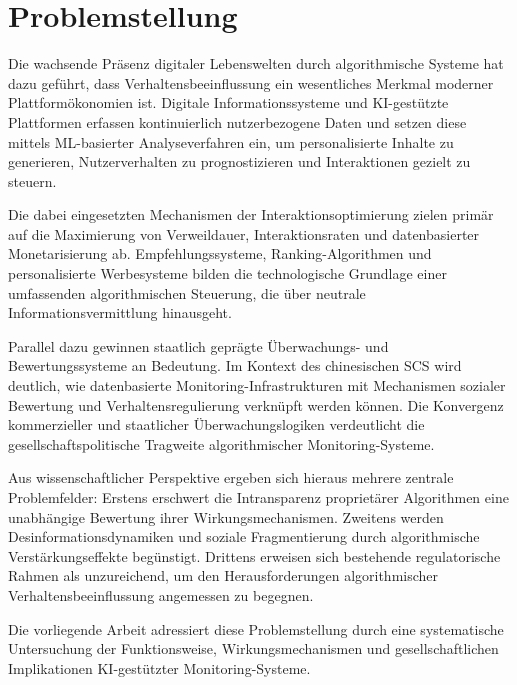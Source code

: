 \section{Problemstellung}

Die wachsende Präsenz digitaler Lebenswelten durch algorithmische Systeme hat dazu geführt, dass Verhaltensbeeinflussung ein wesentliches Merkmal moderner Plattformökonomien ist. Digitale Informationssysteme und \ac{KI}-gestützte Plattformen erfassen kontinuierlich nutzerbezogene Daten und setzen diese mittels \ac{ML}-basierter Analyseverfahren ein, um personalisierte Inhalte zu generieren, Nutzerverhalten zu prognostizieren und Interaktionen gezielt zu steuern.

Die dabei eingesetzten Mechanismen der Interaktionsoptimierung zielen primär auf die Maximierung von Verweildauer, Interaktionsraten und datenbasierter Monetarisierung ab. Empfehlungssysteme, Ranking-Algorithmen und personalisierte Werbesysteme bilden die technologische Grundlage einer umfassenden algorithmischen Steuerung, die über neutrale Informationsvermittlung hinausgeht.

Parallel dazu gewinnen staatlich geprägte Überwachungs- und Bewertungssysteme an Bedeutung. Im Kontext des chinesischen \ac{SCS} wird deutlich, wie datenbasierte Monitoring-Infrastrukturen mit Mechanismen sozialer Bewertung und Verhaltensregulierung verknüpft werden können. Die Konvergenz kommerzieller und staatlicher Überwachungslogiken verdeutlicht die gesellschaftspolitische Tragweite algorithmischer Monitoring-Systeme.

Aus wissenschaftlicher Perspektive ergeben sich hieraus mehrere zentrale Problemfelder: Erstens erschwert die Intransparenz proprietärer Algorithmen eine unabhängige Bewertung ihrer Wirkungsmechanismen. Zweitens werden Desinformationsdynamiken und soziale Fragmentierung durch algorithmische Verstärkungseffekte begünstigt. Drittens erweisen sich bestehende regulatorische Rahmen als unzureichend, um den Herausforderungen algorithmischer Verhaltensbeeinflussung angemessen zu begegnen.

Die vorliegende Arbeit adressiert diese Problemstellung durch eine systematische Untersuchung der Funktionsweise, Wirkungsmechanismen und gesellschaftlichen Implikationen \ac{KI}-gestützter Monitoring-Systeme.


